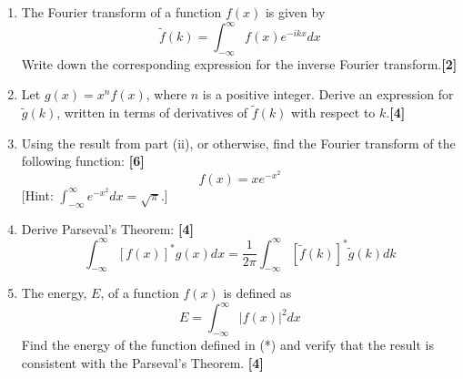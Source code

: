 \documentclass[a4paper]{article}
\begin{document}
\newpage
\begin{qns}\leavevmode
\begin{enumerate}[label=(\roman*)]
\item The Fourier transform of a function $f(x)$ is given by
$$\tilde{f}(k)=\int_{-\infty}^\infty f(x)e^{-ikx}dx$$
Write down the corresponding expression for the inverse Fourier transform.\hfill \textbf{[2]}
\item Let $g(x)=x^nf(x)$, where $n$ is a positive integer. Derive an expression for $\tilde{g}(k)$, written in terms of derivatives of $\tilde{f}(k)$ with respect to $k$.\hfill \textbf{[4]}
\item Using the result from part (ii), or otherwise, find the Fourier transform of the following function: \hfill \textbf{[6]}
\begin{equation}
    f(x)=xe^{-x^2}\tag{*}
\end{equation}
[Hint: $\int_{-\infty}^\infty e^{-x^2}dx=\sqrt{\pi}$.]
\item Derive Parseval's Theorem: \hfill \textbf{[4]}
$$\int_{-\infty}^\infty[f(x)]^*g(x)dx=\frac{1}{2\pi}\int_{-\infty}^\infty[\tilde{f}(k)]^*\tilde{g}(k)dk$$
\item The energy, $E$, of a function $f(x)$ is defined as
$$E=\int_{-\infty}^\infty |f(x)|^2dx$$
Find the energy of the function defined in (*) and verify that the result is consistent with the Parseval's Theorem. \hfill \textbf{[4]}
\end{enumerate}
\end{qns}
\end{document}
